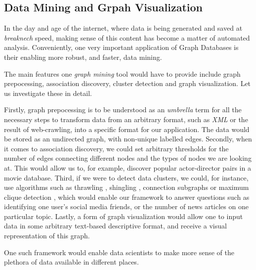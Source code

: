 \documentclass[10pt,        %
               a4paper,     %
               journal,     %
               ]{IEEEtran}
\begin{document}
\subsection{Data Mining and Grpah Visualization}
In the day and age of the internet, where data is being generated and saved at \textit{breaknech} speed, making sense of this content has become a matter of automated analysis. Conveniently, one very important application of Graph Databases is their enabling more robust, and faster, data mining. \par
The main features one \textit{graph mining} tool would have to provide include graph prepocessing, association discovery, cluster detection and graph visualization. Let us investigate these in detail. \par
Firstly, graph prepocessing is to be understood as an \textit{umbrella} term for all the necessary steps to transform data from an arbitrary format, such as \textit{XML} or the result of web-crawling, into a specific format for our application. The data would be stored as an undirected graph, with non-unique labelled edges. \cite{IEEEpaper2:mining} Secondly, when it comes to association discovery, we could set arbitrary thresholds for the number of edges connecting different nodes and the types of nodes we are looking at. This would allow us to, for example, discover popular actor-director pairs in a movie database. Third, if we were to detect data clusters, we could, for instance, use algorithms such as thrawling \cite{paper_2_ref_1}, shingling \cite{paper_2_ref_2}, connection subgraphs \cite{paper_2_ref_3} or maximum clique detection \cite{paper_2_ref_4}, which would enable our framework to answer questions such as identifying one user's social media friends, or the number of news articles on one particular topic. Lastly, a form of graph visualization would allow one to input data in some arbitrary text-based descriptive format, and receive a visual representation of this graph. \par
One such framework would enable data scientists to make more sense of the plethora of data available in different places. 
\end{document}
